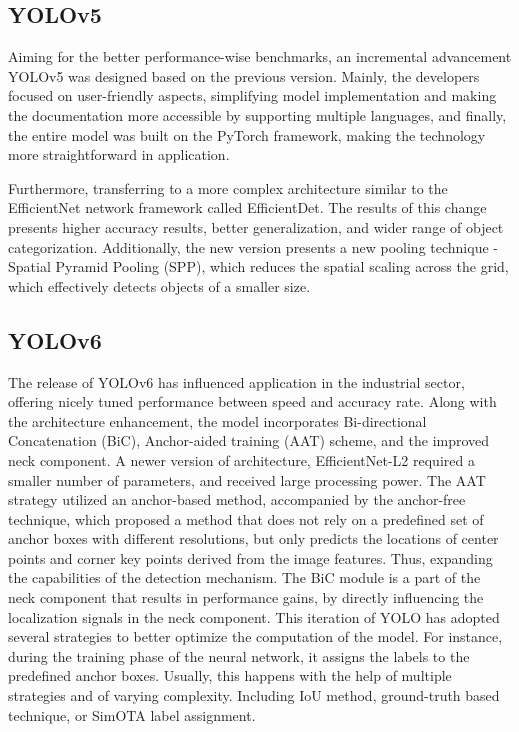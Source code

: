 \begin{multicols}{2}
\subsection{YOLOv5}
Aiming for the better performance-wise benchmarks, an incremental advancement YOLOv5 was designed based on the previous version. Mainly, the developers focused on user-friendly aspects, simplifying model implementation and making the documentation more accessible by supporting multiple languages, and finally, the entire model was built on the PyTorch framework, making the technology more straightforward in application. 

Furthermore, transferring to a more complex architecture similar to the EfficientNet network framework called EfficientDet. The results of this change presents higher accuracy results, better generalization, and wider range of object categorization. Additionally, the new version presents a new pooling technique - Spatial Pyramid Pooling (SPP), which reduces the spatial scaling across the grid, which effectively detects objects of a smaller size. 


\subsection{YOLOv6}
The release of YOLOv6 has influenced application in the industrial sector, offering nicely tuned performance between speed and accuracy rate. Along with the architecture enhancement, the model incorporates Bi-directional Concatenation (BiC), Anchor-aided training (AAT) scheme, and the improved neck component. A newer version of architecture, EfficientNet-L2 required a smaller number of parameters, and received large processing power. The AAT strategy utilized an anchor-based method, accompanied by the anchor-free technique, which proposed a method that does not rely on a predefined set of anchor boxes with different resolutions, but only predicts the locations of center points and corner key points derived from the image features. Thus, expanding the capabilities of the detection mechanism. The BiC module is a part of the neck component that results in performance gains, by directly influencing the localization signals in the neck component. This iteration of YOLO has adopted several strategies to better optimize the computation of the model. For instance, during the training phase of the neural network, it assigns the labels to the predefined anchor boxes. Usually, this happens with the help of multiple strategies and of varying complexity. Including IoU method, ground-truth based technique, or SimOTA label assignment.


\end{multicols}
